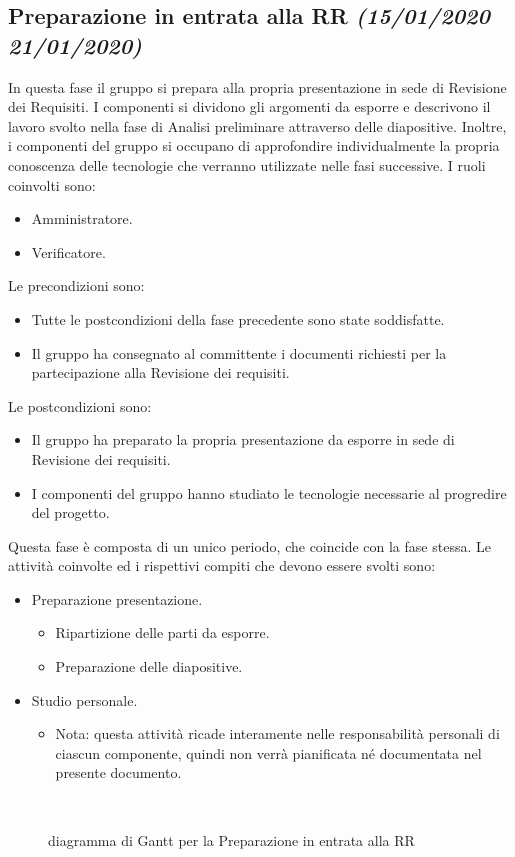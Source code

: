 \documentclass[../piano-di-progetto.tex]{subfiles}
\begin{document}
\subsection[Preparazione in entrata alla RR]{Preparazione in entrata alla RR {\normalsize\normalfont\itshape(15/01/2020  21/01/2020)}}%
\label{sub:preparazione_in_entrata_alla_rr}
In questa fase il gruppo si prepara alla propria presentazione in sede di Revisione dei Requisiti.
I componenti si dividono gli argomenti da esporre e descrivono il lavoro svolto nella fase di Analisi preliminare attraverso delle diapositive.
Inoltre, i componenti del gruppo si occupano di approfondire individualmente la propria conoscenza delle tecnologie che verranno utilizzate nelle fasi successive.
I ruoli coinvolti sono:
\begin{itemize}
  \item Amministratore.
  \item Verificatore.
\end{itemize}
Le precondizioni sono:
\begin{itemize}
  \item Tutte le postcondizioni della fase precedente sono state soddisfatte.
  \item Il gruppo ha consegnato al committente i documenti richiesti per la partecipazione alla Revisione dei requisiti.
\end{itemize}
Le postcondizioni sono:
\begin{itemize}
  \item Il gruppo ha preparato la propria presentazione da esporre in sede di Revisione dei requisiti.
  \item I componenti del gruppo hanno studiato le tecnologie necessarie al progredire del progetto.
\end{itemize}
Questa fase è composta di un unico periodo, che coincide con la fase stessa.
Le attività coinvolte ed i rispettivi compiti che devono essere svolti sono:
\begin{itemize}
  \item Preparazione presentazione.
  \begin{itemize}
    \item Ripartizione delle parti da esporre.
    \item Preparazione delle diapositive.
  \end{itemize}
  \item Studio personale.
  \begin{itemize}
    \renewcommand{\labelitemii}{\(\times\)} %
    \item Nota: questa attività ricade interamente nelle responsabilità personali di ciascun componente, quindi non verrà pianificata né documentata nel presente documento.
  \end{itemize}
\end{itemize}
\begin{figure}[H]
  \centering
  
  \caption{diagramma di Gantt per la Preparazione in entrata alla RR}%
~~\label{fig:gantt_preparazione_rr}
\end{figure}
\end{document}
